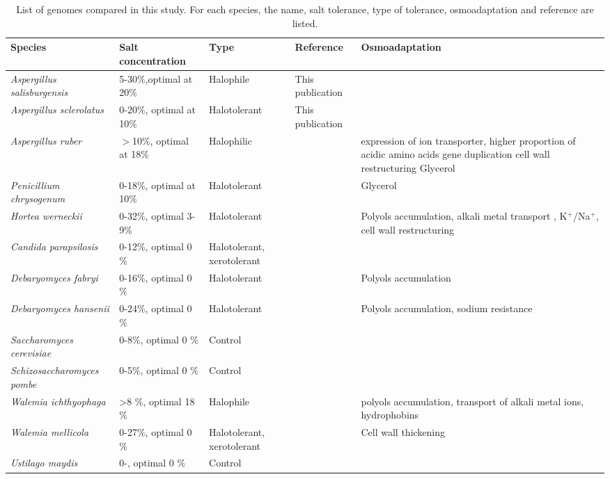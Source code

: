 \documentclass[jof,article,submit,moreauthors,pdftex,10pt,a4paper]{Definitions/mdpi}
\newcommand{\horWer}{\textit{Hortea werneckii}}
\newcommand{\aspRub}{\textit{Aspergillus ruber}}
\newcommand{\penChr}{\textit{Penicillium chrysogenum}}
\newcommand{\debFab}{\textit{Debaryomyces fabryi}}
\newcommand{\debHan}{\textit{Debaryomyces hansenii}}
\newcommand{\walIch}{\textit{Walemia ichthyophaga}}
\newcommand{\walMel}{\textit{Walemia mellicola}}
\newcommand{\canPar}{\textit{Candida parapsilosis}}
\newcommand{\sacCer}{\textit{Saccharomyces cerevisiae}}
\newcommand{\schPom}{\textit{Schizosaccharomyces pombe}}
\newcommand{\phiSp}{\textit{Aspergillus salisburgensis}}
\newcommand{\phiScl}{\textit{Aspergillus sclerolatus}}
\newcommand{\ustMay}{\textit{Ustilago maydis}}
\begin{document}
\begin{table}[htbp]
  \begin{center}
    \small
    \begin{tabular}{|l|l|p{2cm}|l|p{5cm}|}
      \hline
      Species   & Salt concentration & Type & Reference & Osmoadaptation \\
      \hline
      {\phiSp}  & 5-30$\%$,optimal at 20$\%$ & Halophile &
      This publication &\\ 
      {\phiScl} & 0-20$\%$, optimal at 10$\%$ & Halotolerant & This publication &\\
      {\aspRub} & $>$10$\%$,  optimal at 18$\%$&  Halophilic
      &\cite{Kis-Papo2014-dn}&       expression of ion transporter, higher
      proportion of acidic amino acids gene duplication cell wall restructuring
      Glycerol\\
      {\penChr} & 0-18$\%$, optimal at 10$\%$ & Halotolerant
      &\cite{Attaby2001}& Glycerol \\
      {\horWer} & 0-32$\%$, optimal 3-9$\%$ & Halotolerant   &
      \cite{Plemenitas2014-et}& Polyols accumulation, alkali metal
      transport , K$^+$/Na$^+$, cell wall restructuring\\
      {\canPar} & 0-12$\%$, optimal 0 $\%$ & Halotolerant, xerotolerant & \cite{Krauke2010-ed}&\\
      {\debFab} & 0-16$\%$, optimal 0 $\%$ & Halotolerant &
      \cite{Michan2013}& Polyols accumulation\\
      {\debHan} & 0-24$\%$, optimal 0 $\%$ & Halotolerant & \cite{Michan2013}& Polyols accumulation, sodium resistance\\
      {\sacCer} & 0-8$\%$, optimal 0 $\%$ & Control & \cite{Lages1999}&\\
      {\schPom} & 0-5$\%$, optimal 0 $\%$ & Control & \cite{Lages1999}&\\
      {\walIch} & >8 $\%$, optimal 18 $\%$ & Halophile &
      ~\cite{Zajc2013} & polyols accumulation, transport of alkali metal
      ions, hydrophobins\\
      {\walMel} & 0-27$\%$, optimal 0 $\%$ & Halotolerant,
      xerotolerant & ~\cite{Kuncic2010} & Cell wall thickening\\
      {\ustMay} & 0-, optimal 0 $\%$ & Control & \cite{Salmeron2011} &\\
      \hline
    \end{tabular}
    \caption{\label{tab:species} List of genomes compared in this
      study. For each species, the name, salt tolerance, type of
      tolerance, osmoadaptation and reference are listed.}
  \end{center}
\end{table}
\end{document}
